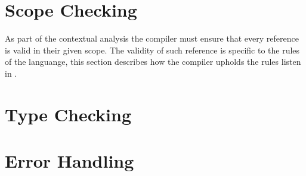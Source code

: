 \section{Scope Checking}
As part of the contextual analysis the compiler must ensure that every reference is valid in their given scope.
The validity of such reference is specific to the rules of the languange, this section describes how the compiler upholds the rules listen in .


\section{Type Checking}


\section{Error Handling}




